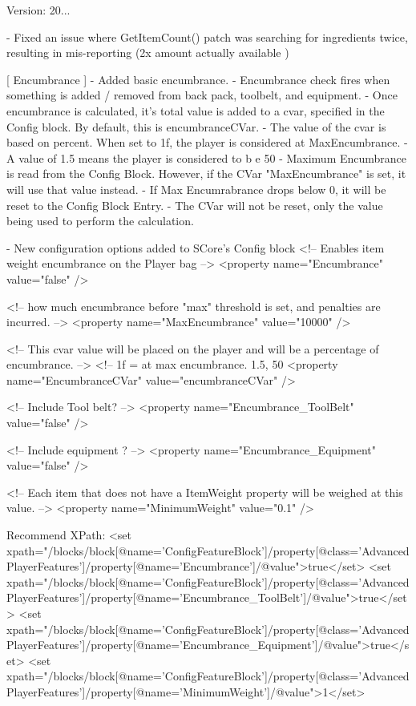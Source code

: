 Version\+: 20... \begin{DoxyVerb}
    - Fixed an issue where GetItemCount() patch was searching for ingredients twice, resulting in mis-reporting (2x amount actually available )

[ Encumbrance ]
    - Added basic encumbrance.
    - Encumbrance check fires when something is added / removed from back pack, toolbelt, and equipment.
    - Once encumbrance is calculated, it's total value is added to a cvar, specified in the Config block. By default, this is encumbranceCVar.
    - The value of the cvar is based on percent.  When set to 1f, the player is considered at MaxEncumbrance. 
        - A value of 1.5 means the player is considered to b e 50%
    - Maximum Encumbrance is read from the Config Block. However, if the CVar "MaxEncumbrance" is set, it will use that value instead.
        - If Max Encumrabrance drops below 0, it will be reset to the Config Block Entry.
        - The CVar will not be reset, only the value being used to perform the calculation.

    - New configuration options added to SCore's Config block
            <!-- Enables item weight encumbrance on the Player bag -->
            <property name="Encumbrance" value="false" />

            <!-- how much encumbrance before "max" threshold is set, and penalties are incurred. -->
            <property name="MaxEncumbrance" value="10000" />

            <!-- This cvar value will be placed on the player and will be a percentage of encumbrance. -->
            <!-- 1f = at max encumbrance. 1.5, 50%
            <property name="EncumbranceCVar" value="encumbranceCVar" />

            <!-- Include Tool belt? -->
            <property name="Encumbrance_ToolBelt" value="false" />

            <!-- Include equipment ? -->
            <property name="Encumbrance_Equipment" value="false" />

            <!-- Each item that does not have a ItemWeight property will be weighed at this value. -->
            <property name="MinimumWeight" value="0.1" />


        Recommend XPath:
            <set xpath="/blocks/block[@name='ConfigFeatureBlock']/property[@class='AdvancedPlayerFeatures']/property[@name='Encumbrance']/@value">true</set>
            <set xpath="/blocks/block[@name='ConfigFeatureBlock']/property[@class='AdvancedPlayerFeatures']/property[@name='Encumbrance_ToolBelt']/@value">true</set>
            <set xpath="/blocks/block[@name='ConfigFeatureBlock']/property[@class='AdvancedPlayerFeatures']/property[@name='Encumbrance_Equipment']/@value">true</set>
            <set xpath="/blocks/block[@name='ConfigFeatureBlock']/property[@class='AdvancedPlayerFeatures']/property[@name='MinimumWeight']/@value">1</set>


\end{DoxyVerb}
